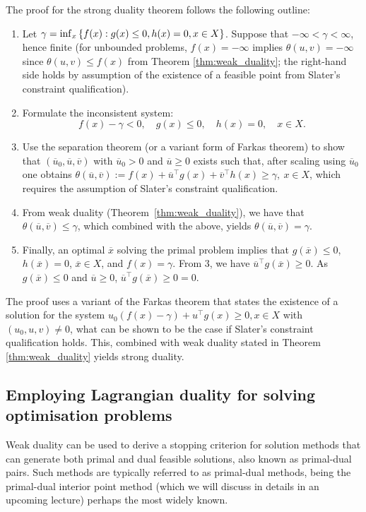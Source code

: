 The proof for the strong duality theorem follows the following outline:
%
\begin{enumerate}
	\item Let $\gamma = \inf_x \left\{ f(x) : g(x) \leq 0, h(x) = 0, x \in X \right \}$. Suppose that $ -\infty < \gamma < \infty$, hence finite (for unbounded problems, $f(x) = -\infty$ implies $\theta(u,v) = -\infty$ since $\theta(u,v) \leq f(x)$ from Theorem \ref{thm:weak_duality}; the right-hand side holds by assumption of the existence of a feasible point from Slater's constraint qualification).
	\item Formulate the inconsistent system: 
	$$f(x) - \gamma < 0, \quad g(x) \leq 0, \quad h(x) = 0, \quad x \in X.$$
	\item Use the separation theorem (or a variant form of Farkas theorem) to show that $(\overline{u}_0, \overline{u}, \overline{v})$ with $\overline{u}_0 > 0$ and $\overline{u} \geq 0$ exists such that, after scaling using $\overline{u}_0$ one obtains 
	$\theta(\overline{u},\overline{v}) := f(x) + \overline{u}^\top g(x) + \overline{v}^\top h(x) \geq \gamma, \ x \in X$, which requires the assumption of Slater's constraint qualification. 
	\item From weak duality (Theorem~\ref{thm:weak_duality}), we have that $\theta(\overline{u},\overline{v}) \leq \gamma$, which combined with the above, yields $\theta(\overline{u},\overline{v}) = \gamma$.
	\item Finally, an optimal $\overline{x}$ solving the primal problem implies that $g(\overline{x}) \leq 0$, $h(\overline{x}) =0$, $\overline{x} \in X$, and $f(x) = \gamma$. From 3, we have $\overline{u}^\top g(\overline{x}) \geq 0$. As $g(\overline{x}) \leq 0$ and $\overline{u}\geq 0$, $\overline{u}^\top g(\overline{x}) \geq 0=0$. 
\end{enumerate}

The proof uses a variant of the Farkas theorem that states the existence of a solution for the system $u_0(f(x) - \gamma) + u^\top g(x) \geq 0, x \in X$ with $(u_0, u, v) \neq 0$, what can be shown to be the case if Slater's constraint qualification holds. This, combined with weak duality stated in Theorem \ref{thm:weak_duality} yields strong duality.  


\subsection{Employing Lagrangian duality for solving optimisation problems}

Weak duality can be used to derive a stopping criterion for solution methods that can generate both primal and dual feasible solutions, also known as primal-dual pairs. Such methods are typically referred to as primal-dual methods, being the primal-dual interior point method (which we will discuss in details in an upcoming lecture) perhaps the most widely known.
	
